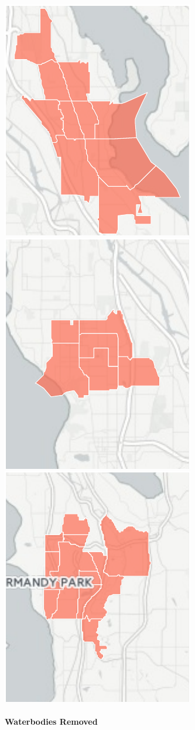 \documentclass[]{article}
\let\oldparagraph\paragraph
\renewcommand{\paragraph}[1]{\oldparagraph{#1}\mbox{}}
\begin{document}
\includegraphics{tracts_files/figure-latex/unnamed-chunk-2-1.pdf}
\includegraphics{tracts_files/figure-latex/unnamed-chunk-2-2.pdf}
\includegraphics{tracts_files/figure-latex/unnamed-chunk-2-3.pdf}

\paragraph{Waterbodies Removed}\label{waterbodies-removed}
\end{document}
